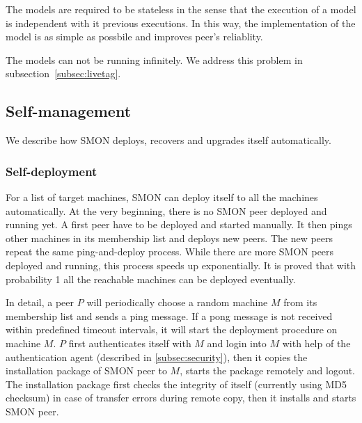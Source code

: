 {The models are required to be stateless in the sense that
the execution of a model is independent with it previous
executions. In this way, the implementation of the model is
as simple as possbile and improves peer's reliablity.



The models can not be running infinitely. We address this
problem in subsection~\ref{subsec:livetag}.
}

\subsection{Self-management}

We describe how SMON deploys, recovers and upgrades itself
automatically.

\subsubsection*{Self-deployment}

For a list of target machines, SMON can deploy itself to all
the machines automatically. At the very beginning, there is
no SMON peer deployed and running yet. A first peer have to
be deployed and started manually. It then pings other
machines in its membership list and deploys new peers. The
new peers repeat the same ping-and-deploy process. While
there are more SMON peers deployed and running, this process
speeds up exponentially. It is proved that with probability
1 all the reachable machines can be deployed
eventually\cite{Eugster2004}.


In detail, a peer $P$ will periodically choose a random
machine $M$ from its membership list and sends a ping
message. If a pong message is not received within predefined
timeout intervals, it will start the deployment procedure on
machine $M$. $P$ first authenticates itself with $M$ and
login into $M$ with help of the authentication agent
(described in \ref{subsec:security}), then it copies the
installation package of SMON peer to $M$, starts the package
remotely and logout. The installation package first
checks the integrity of itself (currently using MD5 checksum)
in case of transfer errors during remote copy, then it
installs and starts SMON peer.

